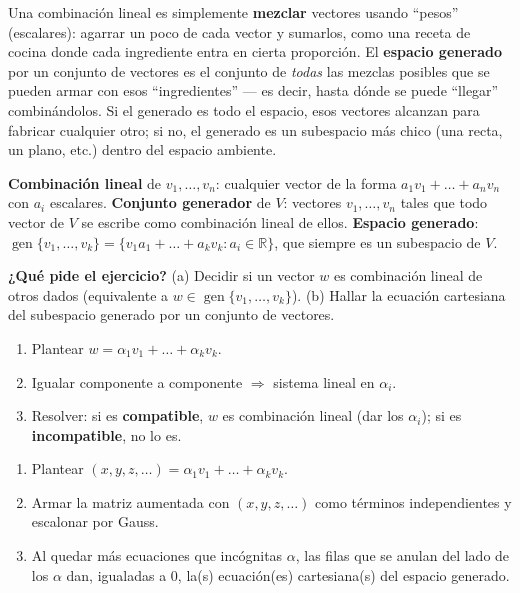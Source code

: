 \documentclass[11pt,a4paper]{article}
\newcommand{\qpide}[1]{\textbf{¿Qué pide el ejercicio?} #1\par}
\begin{document}
\begin{intuicion}
Una combinación lineal es simplemente \textbf{mezclar} vectores usando ``pesos''
(escalares): agarrar un poco de cada vector y sumarlos, como una receta de cocina donde
cada ingrediente entra en cierta proporción. El \textbf{espacio generado} por un conjunto
de vectores es el conjunto de \emph{todas} las mezclas posibles que se pueden armar con
esos ``ingredientes'' — es decir, hasta dónde se puede ``llegar'' combinándolos. Si el
generado es todo el espacio, esos vectores alcanzan para fabricar cualquier otro; si no,
el generado es un subespacio más chico (una recta, un plano, etc.) dentro del espacio
ambiente.
\end{intuicion}

\begin{teoria}
\textbf{Combinación lineal} de $v_1,\dots,v_n$: cualquier vector de la forma
$a_1v_1+\dots+a_nv_n$ con $a_i$ escalares. \textbf{Conjunto generador} de $V$: vectores
$v_1,\dots,v_n$ tales que todo vector de $V$ se escribe como combinación lineal de ellos.
\textbf{Espacio generado}: $\operatorname{gen}\{v_1,\dots,v_k\}=\{v_1a_1+\dots+a_kv_k:
a_i\in\mathbb R\}$, que siempre es un subespacio de $V$.
\end{teoria}

\qpide{(a) Decidir si un vector $w$ es combinación lineal de otros dados (equivalente a
$w\in\operatorname{gen}\{v_1,\dots,v_k\}$). (b) Hallar la ecuación cartesiana del
subespacio generado por un conjunto de vectores.}

\begin{proc}[Procedimiento (a)]
\begin{enumerate}
    \item Plantear $w=\alpha_1v_1+\dots+\alpha_kv_k$.
    \item Igualar componente a componente $\Rightarrow$ sistema lineal en $\alpha_i$.
    \item Resolver: si es \textbf{compatible}, $w$ es combinación lineal (dar los
    $\alpha_i$); si es \textbf{incompatible}, no lo es.
\end{enumerate}
\end{proc}

\begin{proc}
\begin{enumerate}
    \item Plantear $(x,y,z,\dots)=\alpha_1v_1+\dots+\alpha_kv_k$.
    \item Armar la matriz aumentada con $(x,y,z,\dots)$ como términos independientes y
    escalonar por Gauss.
    \item Al quedar más ecuaciones que incógnitas $\alpha$, las filas que se anulan del
    lado de los $\alpha$ dan, igualadas a $0$, la(s) ecuación(es) cartesiana(s) del
    espacio generado.
\end{enumerate}
\end{proc}
\end{document}
